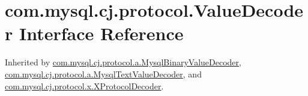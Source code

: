 \hypertarget{interfacecom_1_1mysql_1_1cj_1_1protocol_1_1_value_decoder}{}\section{com.\+mysql.\+cj.\+protocol.\+Value\+Decoder Interface Reference}
\label{interfacecom_1_1mysql_1_1cj_1_1protocol_1_1_value_decoder}


Inherited by \mbox{\hyperlink{classcom_1_1mysql_1_1cj_1_1protocol_1_1a_1_1_mysql_binary_value_decoder}{com.\+mysql.\+cj.\+protocol.\+a.\+Mysql\+Binary\+Value\+Decoder}}, \mbox{\hyperlink{classcom_1_1mysql_1_1cj_1_1protocol_1_1a_1_1_mysql_text_value_decoder}{com.\+mysql.\+cj.\+protocol.\+a.\+Mysql\+Text\+Value\+Decoder}}, and \mbox{\hyperlink{classcom_1_1mysql_1_1cj_1_1protocol_1_1x_1_1_x_protocol_decoder}{com.\+mysql.\+cj.\+protocol.\+x.\+X\+Protocol\+Decoder}}.

